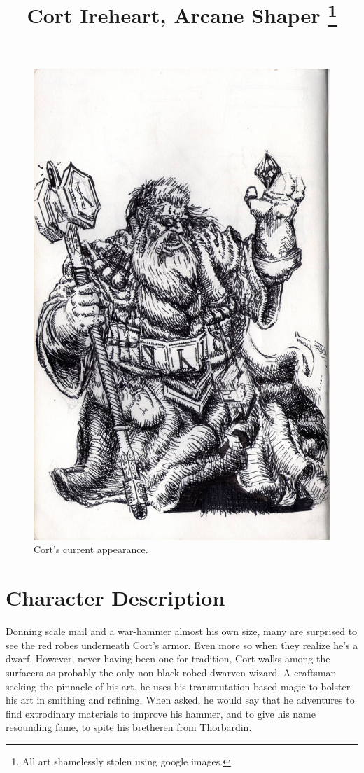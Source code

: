 \documentclass[12pt]{article}
\begin{document}
 
\title{Cort Ireheart, Arcane Shaper \footnote{All art shamelessly stolen using google images.}}
\date{}

\maketitle


\begin{figure}[H]
  \centering
  \includegraphics[width=.62\textwidth]{./resources/Cort_Ireheart.jpg}
  \caption{Cort's current appearance.}
\end{figure}

\section{Character Description}

Donning scale mail and a war-hammer almost his own size, many are surprised to
see the red robes underneath Cort's armor. Even more so when they realize he's
a dwarf. However, never having been one for tradition, Cort walks among the
surfacers as probably the only non black robed dwarven wizard. A craftsman
seeking the pinnacle of his art, he uses his transmutation based magic to
bolster his art in smithing and refining. When asked, he would say that he
adventures to find extrodinary materials to improve his hammer, and to give his
name resounding fame, to spite his bretheren from Thorbardin.
\end{document}
